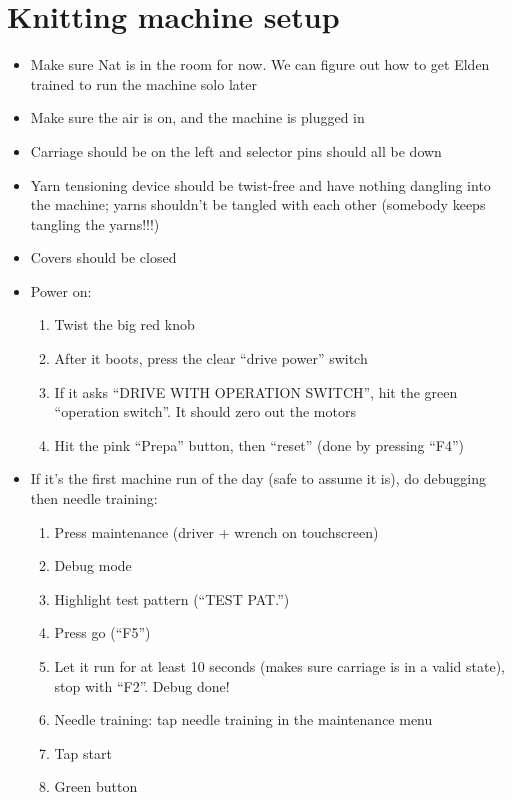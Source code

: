 \documentclass[acmsmall,screen,review,anonymous,nonacm]{acmart}
\begin{document}
\section{Knitting machine setup}
\label{sec:setup}
\begin{itemize}
    \item Make sure Nat is in the room for now. We can figure out how to get Elden trained to
        run the machine solo later
    \item Make sure the air is on, and the machine is plugged in
    \item Carriage should be on the left and selector pins should all be down
    \item Yarn tensioning device should be twist-free and have nothing dangling into the
        machine; yarns shouldn't be tangled with each other (somebody keeps tangling the yarns!!!)
    \item Covers should be closed
    \item Power on: \begin{enumerate}
            \item Twist the big red knob
            \item After it boots, press the clear ``drive power'' switch
            \item If it asks ``DRIVE WITH OPERATION SWITCH'', hit the green ``operation switch''. It
                should zero out the motors
            \item Hit the pink ``Prepa'' button, then ``reset'' (done by pressing ``F4'')
        \end{enumerate}
    \item If it's the first machine run of the day (safe to assume it is), do debugging then needle training: \begin{enumerate}
            \item Press maintenance (driver + wrench on touchscreen)
            \item Debug mode
            \item Highlight test pattern (``TEST PAT.'')
            \item Press go (``F5'')
            \item Let it run for at least 10 seconds (makes sure carriage is in a valid state), stop with ``F2''. Debug done!
            \item Needle training: tap needle training in the maintenance menu
            \item Tap start
            \item Green button
        \end{enumerate}
\end{itemize}
\end{document}
